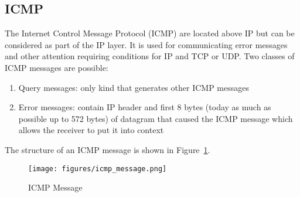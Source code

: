 \subsection{ICMP}
The Internet Control Message Protocol (ICMP) are located above IP but can be considered as part of the IP layer.
It is used for communicating error messages and other attention requiring conditions for IP and TCP or UDP\@.
Two classes of ICMP messages are possible:
\begin{enumerate}
  \item Query messages: only kind that generates other ICMP messages
  \item Error messages: contain IP header and first 8 bytes (today as much as possible up to 572 bytes) of datagram that caused the ICMP message which allows the receiver to put it into context
\end{enumerate}
The structure of an ICMP message is shown in Figure~\ref{fig:icmp_message}.
\begin{figure}[H]
  \centering
  \texttt{[image: figures/icmp\_message.png]}
  \caption{ICMP Message}\label{fig:icmp_message}
\end{figure}

